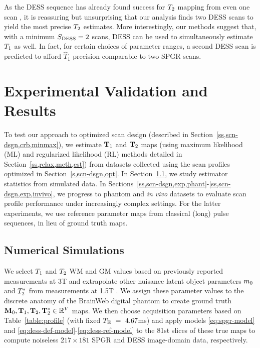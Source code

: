 As the DESS sequence has already found success 
for $T_2$ mapping from even one scan \cite{welsch:09:reo}, 
it is reassuring but unsurprising that our analysis finds two DESS scans 
to yield the most precise $T_2$ estimates. 
More interestingly, 
our methods suggest that, 
with a minimum $S_{\mathrm{DESS}} = 2$ scans, 
DESS can be used to simultaneously estimate $T_1$ as well. 
In fact, for certain choices of parameter ranges, 
a second DESS scan is predicted 
to afford $\widehat{T}_1$ precision 
comparable to two SPGR scans. 

\section{Experimental Validation and Results}
\label{s,scn-dsgn,exp}

To test our approach 
to optimized scan design 
(described in Section~\ref{ss,scn-dsgn,crb,minmax}), 
we estimate $\mathbf{T}_1$ and $\mathbf{T}_2$ maps 
(using maximum likelihood (ML) and 
regularized likelihood (RL) methods 
detailed in Section~\ref{ss,relax,meth,est}) 
from datasets collected 
using the scan profiles 
optimized in Section~\ref{s,scn-dsgn,opt}. 
In Section~\ref{ss,scn-dsgn,exp,sim}, 
we study estimator statistics from simulated data.
In Sections~\ref{ss,scn-dsgn,exp,phant}-\ref{ss,scn-dsgn,exp,invivo}, 
we progress to phantom and \emph{in vivo} datasets 
to evaluate scan profile performance 
under increasingly complex settings.
For the latter experiments, 
we use reference parameter maps 
from classical (long) pulse sequences, 
in lieu of ground truth maps.

\subsection{Numerical Simulations}
\label{ss,scn-dsgn,exp,sim}

We select $T_1$ and $T_2$ WM and GM values 
based on previously reported measurements 
at 3T \cite{wansapura:99:nrt, stanisz:05:ttr} 
and extrapolate other nuisance latent object parameters 
$m_0$ and $T_2^*$
from measurements at 1.5T \cite{kwan:99:msb}. 
We assign these parameter values
to the discrete anatomy 
of the BrainWeb digital phantom 
\cite{collins:98:dac, kwan:99:msb} 
to create ground truth $\mathbf{M}_0, \mathbf{T}_1, \mathbf{T}_2, \mathbf{T}_2^* \in \mathbb{R}^{V}$ maps. 
We then choose acquisition parameters based 
on Table~\ref{table:profile} 
(with fixed $T_\mathrm{E}~=~4.67$ms) 
and apply models \eqref{eq:spgr-model} 
and \eqref{eq:dess-def-model}-\eqref{eq:dess-ref-model} 
to the 81st slices of these true maps 
to compute noiseless $217 \times 181$ SPGR and DESS image-domain data, 
respectively. 

